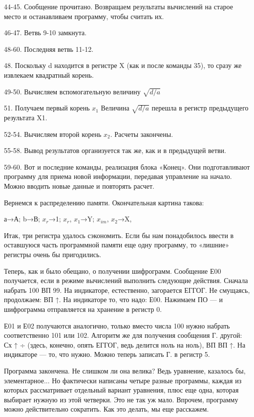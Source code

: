 \documentclass[11pt,a4paper,oneside]{article}
\begin{document}
44-45. Сообщение прочитано. Возвращаем результаты вычислений на старое место и останавливаем программу, чтобы считать их.

46-47. Ветвь 9-10 замкнута.

48-60. Последняя ветвь 11-12.

48. Поскольку d находится в регистре X (как и после команды 35), то сразу же извлекаем квадратный корень.

49-50. Вычисляем вспомогательную величину $\sqrt{d/a}$

51. 	Получаем первый корень $x_{1}$ Величина $\sqrt{d/a}$ перешла в регистр предыдущего результата X1.

52-54. Вычисляем второй корень $x_{2}$. Расчеты закончены.

55-58. Вывод результатов организуется так же, как и в предыдущей ветви.

59-60. Вот и последние команды, реализация блока «Конец». Они подготавливают программу для приема новой информации, передавая управление на начало. Можно вводить новые данные и повторять расчет.

Вернемся к распределению памяти. Окончательная картина такова:

а→А; b→В; $x_{r}$→1;
$x_{r}$, $x_{1}$→Y; $x_{im}$, $x_{2}$→X,

Итак, три регистра удалось сэкономить. Если бы нам понадобилось ввести в оставшуюся часть программной памяти еще одну программу, то «лишние» регистры очень бы пригодились.

Теперь, как и было обещано, о получении шифрограмм. Сообщение Е00 получается, если в режиме вычислений выполнить следующие действия. Сначала набрать 100 ВП 99. На индикаторе, естественно, загорается ЕГГОГ. Не смущаясь, продолжаем: ВП ↑. На индикаторе то, что надо: Е00. Нажимаем ПО — и шифрограмма отправляется на хранение в регистр 0.

Е01 и Е02 получаются аналогично, только вместо числа 100 нужно набрать соответственно 101 или 102. Алгоритм же для получения сообщения Г. другой: Сх ↑ ÷ (здесь, конечно, опять ЕГГОГ, ведь делится ноль на ноль), ВП ВП ↑. На индикаторе — то, что нужно. Можно теперь записать Г. в регистр 5.

Программа закончена. Не слишком ли она велика? Ведь уравнение, казалось бы, элементарное... Но фактически написаны четыре разные программы, каждая из которых рассматривает отдельный вариант уравнения, плюс еще одна, которая выбирает нужную из этой четверки. Это не так уж мало. Впрочем, программу можно действительно сократить. Как это делать, мы еще расскажем.
\end{document}
